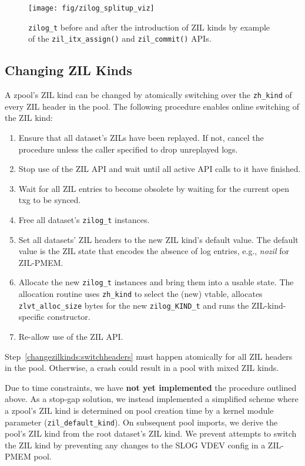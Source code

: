 \documentclass[12pt,a4paper,twoside]{book}
\begin{document}
{\begin{figure}[H]
    \centering
    \texttt{[image: fig/zilog\_splitup\_viz]}
    \caption{\lstinline{zilog_t} before and after the introduction of ZIL kinds by example of the \lstinline{zil_itx_assign()} and \lstinline{zil_commit()} APIs.}
    \label{fig:zilog_splitup_viz}
\end{figure}


\subsection{Changing ZIL Kinds}\label{sec:zil_kinds:change}
A zpool's ZIL kind can be changed by atomically switching over the \lstinline{zh_kind} of every ZIL header in the pool.
The following procedure enables online switching of the ZIL kind:
\begin{enumerate}[noitemsep]
    \item Ensure that all dataset's ZILs have been replayed. If not, cancel the procedure unless the caller specified to drop unreplayed logs.
    \item Stop use of the ZIL API and wait until all active API calls to it have finished.
    \item Wait for all ZIL entries to become obsolete by waiting for the current open txg to be synced.
    \item Free all dataset's \lstinline{zilog_t} instances.
    \item \label{changezilkinds:switchheaders} Set all datasets' ZIL headers to the new ZIL kind's default value.
        The default value is the ZIL state that encodes the absence of log entries, e.g., \textit{nozil} for ZIL-PMEM.
    \item Allocate the new \lstinline{zilog_t} instances and bring them into a usable state.
        The allocation routine uses \lstinline{zh_kind} to select the (new) vtable, allocates \lstinline{zlvt_alloc_size} bytes for the new \lstinline{zilog_KIND_t} and runs the ZIL-kind-specific constructor.
    \item Re-allow use of the ZIL API.
\end{enumerate}
Step~\ref{changezilkinds:switchheaders} must happen atomically for all ZIL headers in the pool.
Otherwise, a crash could result in a pool with mixed ZIL kinds.

Due to time constraints, we have \textbf{not yet implemented} the procedure outlined above.
As a stop-gap solution, we instead implemented a simplified scheme where a zpool's ZIL kind is determined on pool creation time by a kernel module parameter (\lstinline{zil_default_kind}).
On subsequent pool imports, we derive the pool's ZIL kind from the root dataset's ZIL kind.
We prevent attempts to switch the ZIL kind by preventing any changes to the SLOG VDEV config in a ZIL-PMEM pool.

}
\end{document}
